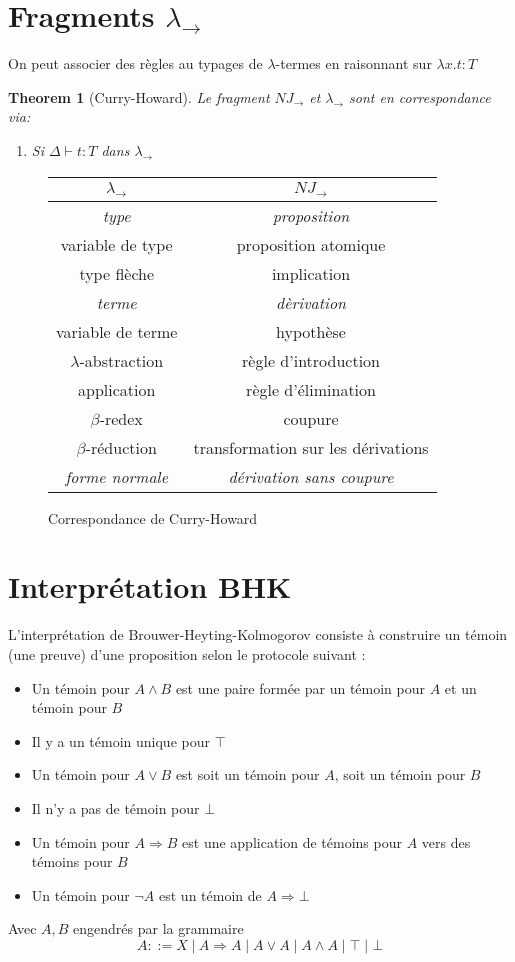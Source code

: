 \documentclass{article}
\newtheorem{thm}{Theorem}
\newcommand\lterm[2]{\lambda #1. #2}
\newcommand\tlambda[0]{$\lambda$}
\begin{document}
\section{Fragments $\lambda_\to$}
On peut associer des règles au typages de \tlambda-termes en raisonnant sur $\lterm{x}{t} : T$


\begin{thm}[Curry-Howard]
Le fragment $NJ_\to$ et $\lambda_\to$ sont en correspondance via:
\begin{enumerate}
\item Si $\Delta \vdash t : T$ dans $\lambda_\to$
\end{enumerate}
\end{thm}

\begin{figure}[h]
\begin{center}
\begin{tabular}{| c | c |}
\hline
$\lambda_\to$ & $NJ_\to$\\
\hline
\emph{type} & \emph{proposition}\\
\hline
variable de type & proposition atomique\\
type flèche & implication\\
\hline
\emph{terme} & \emph{dèrivation}\\
\hline
variable de terme & hypothèse\\
\tlambda-abstraction & règle d'introduction\\
application & règle d'élimination\\
$\beta$-redex & coupure\\
$\beta$-réduction & transformation sur les dérivations\\
\hline
\emph{forme normale} & \emph{dérivation sans coupure}\\
\hline
\end{tabular}
\caption{Correspondance de Curry-Howard}
\end{center}
\end{figure}


\section{Interprétation BHK}
L'interprétation de Brouwer-Heyting-Kolmogorov consiste à construire un témoin (une preuve) d'une proposition selon le protocole suivant :
\begin{itemize}
\item Un témoin pour $A \land B$ est une paire formée par un témoin pour $A$ et un témoin pour $B$
\item Il y a un témoin unique pour $\top$
\item Un témoin pour $A\lor B$ est soit un témoin pour $A$, soit un témoin pour $B$
\item Il n'y a pas de témoin pour $\bot$
\item Un témoin pour $A\Rightarrow B$ est une application de témoins pour $A$ vers des témoins pour $B$
\item Un témoin pour $\neg A$ est un témoin de $A \Rightarrow \bot$
\end{itemize}
Avec $A, B$ engendrés par la grammaire
\[A ::= X \;|\: A \Rightarrow A \;|\; A \lor A \;|\; A \land A \;|\; \top \;|\; \bot\]
\end{document}
